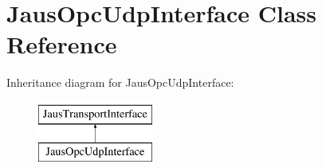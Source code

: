 \hypertarget{class_jaus_opc_udp_interface}{\section{\-Jaus\-Opc\-Udp\-Interface \-Class \-Reference}
\label{class_jaus_opc_udp_interface}
}
\-Inheritance diagram for \-Jaus\-Opc\-Udp\-Interface\-:\begin{figure}[H]
\begin{center}
\leavevmode
\includegraphics[height=2.000000cm]{class_jaus_opc_udp_interface}
\end{center}
\end{figure}
